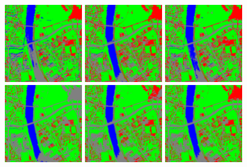 \begin{figure}[!h]
  \center
  \includegraphics[width=0.3\textwidth]{../Art/MonteverdiImages/QB_1_ortho_C1_CM.png}
  \includegraphics[width=0.3\textwidth]{../Art/MonteverdiImages/QB_1_ortho_C2_CM.png}
  \includegraphics[width=0.3\textwidth]{../Art/MonteverdiImages/QB_1_ortho_C3_CM.png}
  \includegraphics[width=0.3\textwidth]{../Art/MonteverdiImages/QB_1_ortho_C4_CM.png}
  \includegraphics[width=0.3\textwidth]{../Art/MonteverdiImages/QB_1_ortho_C5_CM.png}
  \includegraphics[width=0.3\textwidth]{../Art/MonteverdiImages/QB_1_ortho_C6_CM.png}
  \label{fig:ClassificationMapFusionApplication}
\end{figure}


